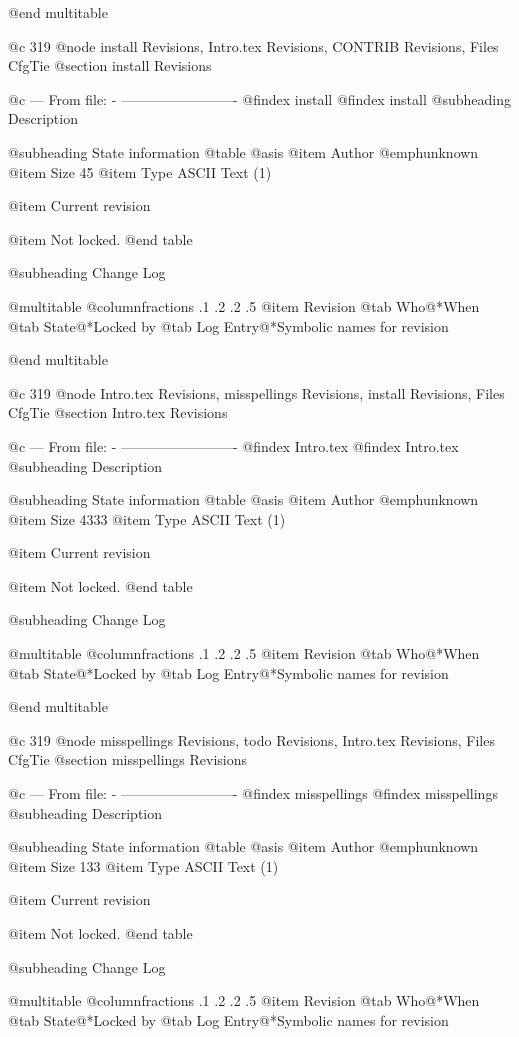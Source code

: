 @end multitable


@c 319
@node install Revisions, Intro.tex Revisions, CONTRIB Revisions, Files CfgTie
@section install Revisions


@c --- From file: - -------------------------
@findex install
@findex install
@subheading Description


@subheading State information
@table @asis
@item Author
@emph{unknown}
@item Size
45
@item Type
ASCII Text (1)

@item Current revision

@item Not locked.
@end table

@subheading Change Log

@multitable @columnfractions .1 .2 .2 .5
@item Revision
@tab Who@*When
@tab State@*Locked by
@tab Log Entry@*Symbolic names for revision


@end multitable


@c 319
@node Intro.tex Revisions, misspellings Revisions, install Revisions, Files CfgTie
@section Intro.tex Revisions


@c --- From file: - -------------------------
@findex Intro.tex
@findex Intro.tex
@subheading Description


@subheading State information
@table @asis
@item Author
@emph{unknown}
@item Size
4333
@item Type
ASCII Text (1)

@item Current revision

@item Not locked.
@end table

@subheading Change Log

@multitable @columnfractions .1 .2 .2 .5
@item Revision
@tab Who@*When
@tab State@*Locked by
@tab Log Entry@*Symbolic names for revision


@end multitable


@c 319
@node misspellings Revisions, todo Revisions, Intro.tex Revisions, Files CfgTie
@section misspellings Revisions


@c --- From file: - -------------------------
@findex misspellings
@findex misspellings
@subheading Description


@subheading State information
@table @asis
@item Author
@emph{unknown}
@item Size
133
@item Type
ASCII Text (1)

@item Current revision

@item Not locked.
@end table

@subheading Change Log

@multitable @columnfractions .1 .2 .2 .5
@item Revision
@tab Who@*When
@tab State@*Locked by
@tab Log Entry@*Symbolic names for revision


